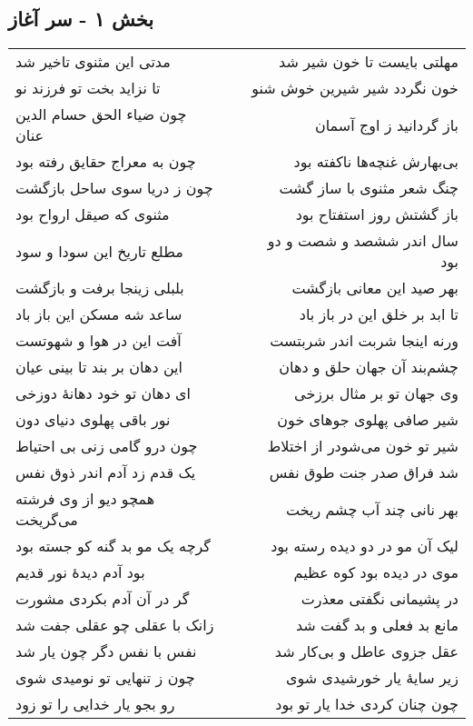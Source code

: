 \begin{center}
\section*{بخش ۱ - سر آغاز}
\label{sec:sh001}
\begin{longtable}{l p{0.5cm} r}
مدتی این مثنوی تاخیر شد
&&
مهلتی بایست تا خون شیر شد
\\
تا نزاید بخت تو فرزند نو
&&
خون نگردد شیر شیرین خوش شنو
\\
چون ضیاء الحق حسام الدین عنان
&&
باز گردانید ز اوج آسمان
\\
چون به معراج حقایق رفته بود
&&
بی‌بهارش غنچه‌ها ناکفته بود
\\
چون ز دریا سوی ساحل بازگشت
&&
چنگ شعر مثنوی با ساز گشت
\\
مثنوی که صیقل ارواح بود
&&
باز گشتش روز استفتاح بود
\\
مطلع تاریخ این سودا و سود
&&
سال اندر ششصد و شصت و دو بود
\\
بلبلی زینجا برفت و بازگشت
&&
بهر صید این معانی بازگشت
\\
ساعد شه مسکن این باز باد
&&
تا ابد بر خلق این در باز باد
\\
آفت این در هوا و شهوتست
&&
ورنه اینجا شربت اندر شربتست
\\
این دهان بر بند تا بینی عیان
&&
چشم‌بند آن جهان حلق و دهان
\\
ای دهان تو خود دهانهٔ دوزخی
&&
وی جهان تو بر مثال برزخی
\\
نور باقی پهلوی دنیای دون
&&
شیر صافی پهلوی جوهای خون
\\
چون درو گامی زنی بی احتیاط
&&
شیر تو خون می‌شودر از اختلاط
\\
یک قدم زد آدم اندر ذوق نفس
&&
شد فراق صدر جنت طوق نفس
\\
همچو دیو از وی فرشته می‌گریخت
&&
بهر نانی چند آب چشم ریخت
\\
گرچه یک مو بد گنه کو جسته بود
&&
لیک آن مو در دو دیده رسته بود
\\
بود آدم دیدهٔ نور قدیم
&&
موی در دیده بود کوه عظیم
\\
گر در آن آدم بکردی مشورت
&&
در پشیمانی نگفتی معذرت
\\
زانک با عقلی چو عقلی جفت شد
&&
مانع بد فعلی و بد گفت شد
\\
نفس با نفس دگر چون یار شد
&&
عقل جزوی عاطل و بی‌کار شد
\\
چون ز تنهایی تو نومیدی شوی
&&
زیر سایهٔ یار خورشیدی شوی
\\
رو بجو یار خدایی را تو زود
&&
چون چنان کردی خدا یار تو بود

\end{longtable}
\end{center}
